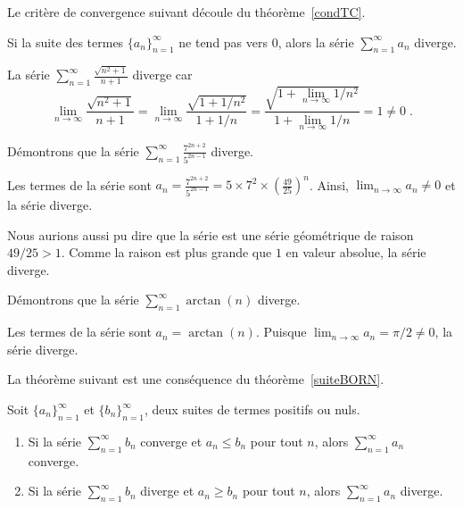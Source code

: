 {Le critère de convergence suivant découle du théorème~\ref{condTC}.

\begin{theorem}
Si la suite des termes $\displaystyle \{a_n\}_{n=1}^\infty$ ne tend
pas vers $0$, alors la série $\displaystyle \sum_{n=1}^\infty a_n$
diverge.
\label{NCforCofS}
\end{theorem}

\begin{egg}
La série $\displaystyle \sum_{n=1}^\infty \frac{\sqrt{n^2+1}}{n+1}$
diverge car
\[
\lim_{n\rightarrow \infty} \frac{\sqrt{n^2+1}}{n+1}
= \lim_{n\rightarrow \infty} \frac{\sqrt{1+1/n^2}}{1+1/n}
= \frac{\sqrt{\displaystyle 1+ \lim_{n\rightarrow \infty}1/n^2}}
{\displaystyle 1+ \lim_{n\rightarrow \infty}1/n} = 1 \neq 0 \; .
\]
\end{egg}

\begin{egg}
Démontrons que la série
$\displaystyle \sum_{n=1}^\infty \frac{7^{2n+2}}{5^{2n-1}}$
diverge.

Les termes de la série sont
$\displaystyle a_n = \frac{7^{2n+2}}{5^{2n-1}} = 5\times 7^2 \times
\left(\frac{49}{25}\right)^n$.   Ainsi,
$\lim_{n\rightarrow \infty} a_n \neq 0$ et la série diverge.

Nous aurions aussi pu dire que la série est une série géométrique de
raison $49/25 > 1$.  Comme la raison est plus grande que $1$ en valeur
absolue, la série diverge.
\end{egg}

\begin{egg}
Démontrons que la série
$\displaystyle \sum_{n=1}^\infty \arctan(n)$ diverge.

Les termes de la série sont $\displaystyle a_n = \arctan(n)$.
Puisque $\lim_{n\rightarrow \infty} a_n = \pi/2 \neq 0$, la série diverge.
\end{egg}

La théorème suivant est une conséquence du théorème~\ref{suiteBORN}.

\begin{theorem} \label{comp_theo}
Soit $\displaystyle \{a_n\}_{n=1}^\infty$ et
$\displaystyle \{b_n\}_{n=1}^\infty$, deux suites de termes positifs
ou nuls.
\begin{enumerate}
\item Si la série $\displaystyle \sum_{n=1}^\infty b_n$ converge et
$a_n\leq b_n$ pour tout $n$, alors $\displaystyle \sum_{n=1}^\infty a_n$
converge.
\item Si la série $\displaystyle \sum_{n=1}^\infty b_n$ diverge et
$a_n\geq b_n$ pour tout $n$, alors $\displaystyle \sum_{n=1}^\infty a_n$
diverge.
\end{enumerate}
\end{theorem}

}
